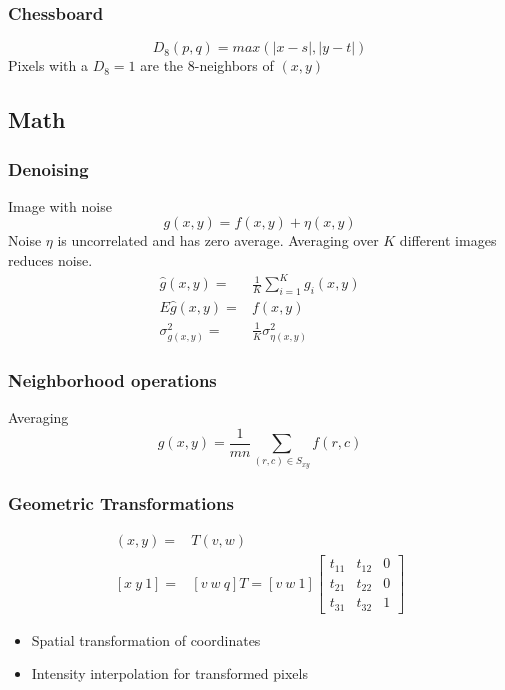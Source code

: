\subsubsection{Chessboard}
\begin{equation}
D_8(p,q) = max(|x-s|, |y-t|)
\end{equation}
Pixels with a $D_8 = 1$ are the 8-neighbors of $(x,y)$

\subsection{Math}

\subsubsection{Denoising}
Image with noise
\begin{equation}
g(x,y) = f(x,y) + \eta(x,y)
\end{equation}
Noise $\eta$ is uncorrelated and has zero average.  Averaging over $K$ different images reduces noise.
\begin{eqnarray}
\hat{g}(x,y)      =& \frac{1}{K} \sum_{i=1}^{K}g_i(x,y) \\
E{\hat{g}(x,y)}   =& f(x,y) \\
\sigma_{g(x,y)}^2 =& \frac{1}{K} \sigma_{\eta(x,y)}^2
\end{eqnarray}

\subsubsection{Neighborhood operations}
Averaging
\begin{equation}
g(x,y) = \frac{1}{mn} \sum_{(r,c)\in S_{xy}}f(r,c)
\end{equation}

\subsubsection{Geometric Transformations}
\begin{eqnarray}
(x,y) =& T{(v,w)} \\
 \left[ x~y~1 \right] =& [ v~w~q ] T = [ v~w~1 ] 
 \left[ \begin{array}{ccc}
t_{11} & t_{12} & 0 \\
t_{21} & t_{22} & 0 \\
t_{31} & t_{32} & 1 \end{array} \right]
\end{eqnarray}
\begin{itemize}
\item Spatial transformation of coordinates
\item Intensity interpolation for transformed pixels
\end{itemize}
